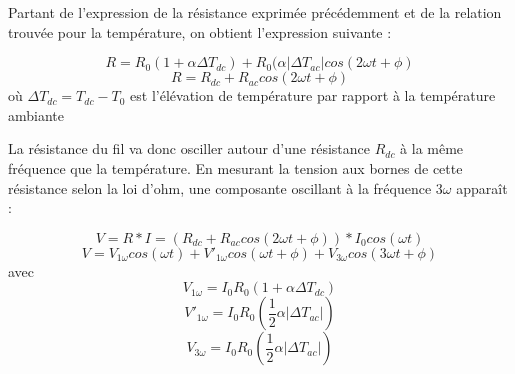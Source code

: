 \documentclass[10pt,a4paper]{report}
\begin{document}
Partant de l’expression de la résistance exprimée précédemment et de la relation trouvée pour la température, on obtient l’expression suivante :
\begin{center}
\begin{equation}
R=R_{0}(1+\alpha \Delta T_{dc})+R_{0}(\alpha \lvert \Delta T_{ac} \rvert cos(2\omega t+\phi)
\end{equation}
\begin{equation}
R=R_{dc}+R_{ac}cos(2\omega t+\phi)
\end{equation}
où $\Delta T_{dc}=T_{dc}-T_{0}$ est l'élévation de température par rapport à la température ambiante
\end{center}
La résistance du fil va donc osciller autour d’une résistance $R_{dc}$ à la même fréquence que la température. En mesurant la tension aux bornes de cette résistance selon la loi d’ohm, une composante oscillant à la fréquence 3$\omega$ apparaît :
\begin{center}
\begin{equation}
V=R*I=(R_{dc}+R_{ac}cos(2\omega t+\phi))*I_{0}cos(\omega t)
\end{equation}
\begin{equation}
V=V_{1\omega}cos(\omega t)+V'_{1\omega}cos(\omega t+\phi)+V_{3\omega}cos(3\omega t+\phi)
\end{equation}
avec 
\begin{equation}
V_{1\omega}=I_{0}R_{0}(1+\alpha \Delta T_{dc})
\end{equation}
\begin{equation}
V'_{1\omega}=I_{0}R_{0}(\frac{1}{2}\alpha \lvert \Delta T_{ac} \rvert)
\end{equation}
\begin{equation}
V_{3\omega}=I_{0}R_{0}(\frac{1}{2}\alpha \lvert \Delta T_{ac} \rvert)
\end{equation}
\end{center}
\end{document}
